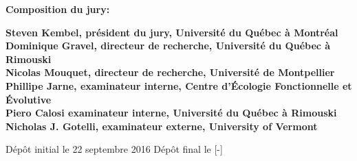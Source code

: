 \thispagestyle{empty}

\null
\vfill
\noindent \textbf{Composition du jury:}\\
\vspace{1cm}

\begin{singlespace}
  \noindent \textbf{Steven Kembel, président du jury, Université du Québec à Montréal}\\

  \noindent \textbf{Dominique Gravel, directeur de recherche, Université du Québec à Rimouski}\\

  \noindent \textbf{Nicolas Mouquet, directeur de recherche, Université de Montpellier}\\

  \noindent \textbf{Phillipe Jarne, examinateur interne, Centre d'Écologie Fonctionnelle et Évolutive}\\

  \noindent \textbf{Piero Calosi examinateur interne, Université du Québec à Rimouski}\\

  \noindent \textbf{Nicholas J. Gotelli, examinateur externe, University of Vermont}\\
\end{singlespace}

\vspace{2cm}
\noindent Dépôt initial le 22 septembre 2016
\hspace{3cm}
Dépôt final le [-]


\cleardoublepage
